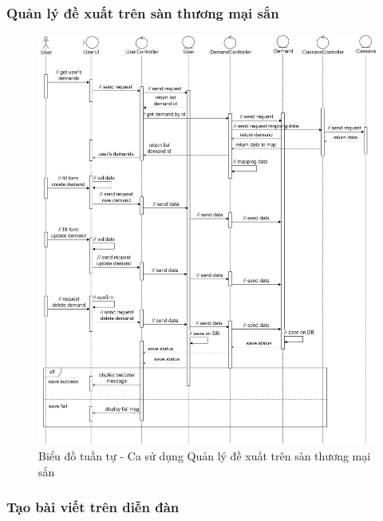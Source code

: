 \documentclass[./../main.tex]{subfiles}
\begin{document}
\subsubsection{Quản lý đề xuất trên sàn thương mại sắn}
\begin{figure}[H]
	\centering
	\includegraphics[width=\linewidth]{./img/uc14.png}
	\caption{Biểu đồ tuần tự - Ca sử dụng Quản lý đề xuất trên sàn thương mại sắn}
\end{figure}

\subsubsection{Tạo bài viết trên diễn đàn}
\end{document}

